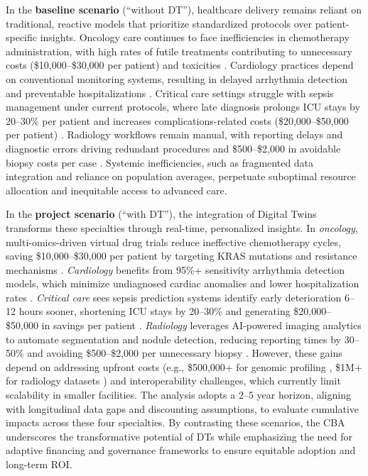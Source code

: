 \documentclass[10pt,a4paper]{article}
\begin{document}
In the \textbf{baseline scenario} (``without DT''), healthcare delivery remains reliant on traditional, reactive models that prioritize standardized protocols over patient-specific insights. Oncology care continues to face inefficiencies in chemotherapy administration, with high rates of futile treatments contributing to unnecessary costs (\$10,000--\$30,000 per patient) and toxicities \cite{Wang2025}. Cardiology practices depend on conventional monitoring systems, resulting in delayed arrhythmia detection and preventable hospitalizations \cite{Ahmed2023}. Critical care settings struggle with sepsis management under current protocols, where late diagnosis prolongs ICU stays by 20--30\% per patient and increases complications-related costs (\$20,000--\$50,000 per patient) \cite{Mascret2024}. Radiology workflows remain manual, with reporting delays and diagnostic errors driving redundant procedures and \$500--\$2,000 in avoidable biopsy costs per case \cite{Bocean2025}. Systemic inefficiencies, such as fragmented data integration and reliance on population averages, perpetuate suboptimal resource allocation and inequitable access to advanced care.

In the \textbf{project scenario} (``with DT''), the integration of Digital Twins transforms these specialties through real-time, personalized insights. In \textit{oncology}, multi-omics-driven virtual drug trials reduce ineffective chemotherapy cycles, saving \$10,000--\$30,000 per patient by targeting KRAS mutations and resistance mechanisms \cite{Wang2025}. \textit{Cardiology} benefits from 95\%+ sensitivity arrhythmia detection models, which minimize undiagnosed cardiac anomalies and lower hospitalization rates \cite{Ahmed2023}. \textit{Critical care} sees sepsis prediction systems identify early deterioration 6--12 hours sooner, shortening ICU stays by 20--30\% and generating \$20,000--\$50,000 in savings per patient \cite{Mascret2024}. \textit{Radiology} leverages AI-powered imaging analytics to automate segmentation and nodule detection, reducing reporting times by 30--50\% and avoiding \$500--\$2,000 per unnecessary biopsy \cite{Bocean2025}. However, these gains depend on addressing upfront costs (e.g., \$500,000+ for genomic profiling \cite{Wang2025}, \$1M+ for radiology datasets \cite{Bocean2025}) and interoperability challenges, which currently limit scalability in smaller facilities. The analysis adopts a 2--5 year horizon, aligning with longitudinal data gaps and discounting assumptions, to evaluate cumulative impacts across these four specialties. By contrasting these scenarios, the CBA underscores the transformative potential of DTs while emphasizing the need for adaptive financing and governance frameworks to ensure equitable adoption and long-term ROI.
\end{document}
